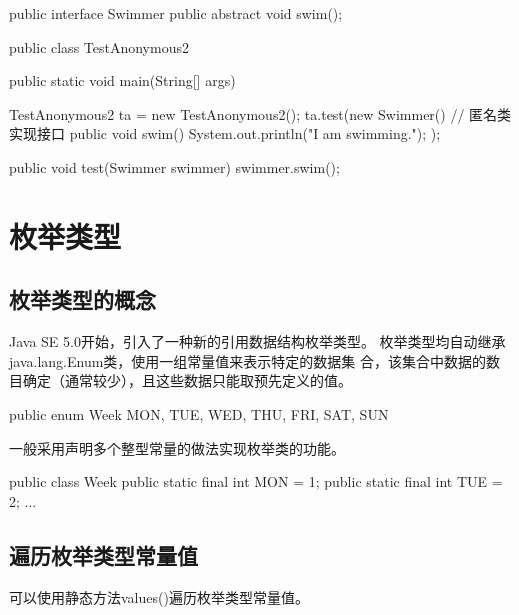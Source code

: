 
\begin{javaCode}
  public interface Swimmer {
    public abstract void swim();
  }
\end{javaCode}


\begin{javaCode}
  public class TestAnonymous2 {
    public static void main(String[] args) {
      TestAnonymous2 ta = new TestAnonymous2();
      ta.test(new Swimmer() { // 匿名类实现接口
        public void swim() {
          System.out.println("I am swimming.");
        }
      });
      
      public void test(Swimmer swimmer) {
        swimmer.swim();
      }
    }
  }
\end{javaCode}


\section{枚举类型}

\subsection{枚举类型的概念}

Java SE 5.0开始，引入了一种新的引用数据结构{\hei\Red 枚举类型}。{\kai
  枚举类型均自动继承java.lang.Enum类，使用一组常量值来表示特定的数据集
  合，该集合中数据的数目确定（通常较少），且这些数据只能取预先定义的值。}

\begin{javaCode}
  public enum Week {
    MON, TUE, WED, THU, FRI, SAT, SUN
  }
\end{javaCode}


一般采用声明多个整型常量的做法实现枚举类的功能。

\begin{javaCode}
  public class Week {
    public static final int MON = 1;
    public static final int TUE = 2;
    ...
  }    
\end{javaCode}


\subsection{遍历枚举类型常量值}

可以使用静态方法values()遍历枚举类型常量值。


